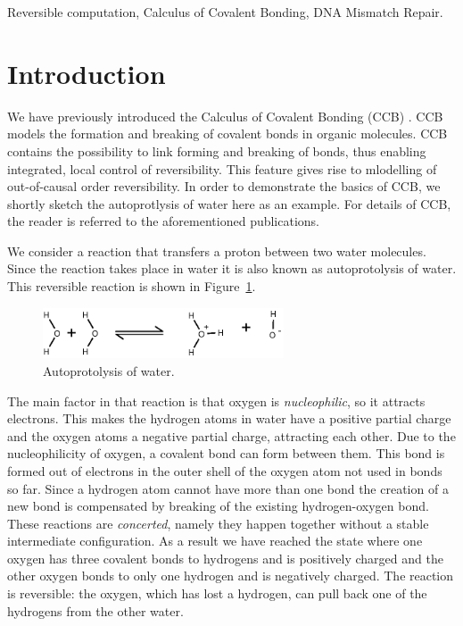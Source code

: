 \documentclass[review]{elsarticle}
\begin{document}
\begin{frontmatter}
\begin{keyword}Reversible computation, Calculus of Covalent Bonding, DNA Mismatch Repair.
\end{keyword}

\end{frontmatter}

\linenumbers

\section{Introduction}

We have previously introduced the Calculus of Covalent  Bonding (CCB) \cite{KU16,KU2017}. CCB models the formation and breaking of covalent bonds in organic molecules. CCB contains the possibility to link forming and breaking of bonds, thus enabling integrated, local control of reversibility. This feature gives rise to mlodelling of out-of-causal order reversibility. In order to demonstrate the basics of CCB, we shortly sketch the autoprotlysis of water here as an example. For details of CCB, the reader is referred to the aforementioned publications.

We consider a reaction that transfers a proton between two water molecules. Since the
reaction takes place in water it is also known as autoprotolysis of water. This reversible reaction is shown 
in Figure~\ref{fig:autoprotolysis}.

\begin{figure}
\centering
\includegraphics[height=1.5cm]{autoprotolysis}
\caption{Autoprotolysis of water.}
\label{fig:autoprotolysis}
\end{figure}

The main factor in that reaction is that oxygen is \emph{nucleophilic}, so it attracts electrons. This makes the hydrogen atoms in water
have a positive partial charge and the oxygen atoms a negative partial charge, attracting each other. Due to the nucleophilicity of 
oxygen, a covalent bond can form between them. This bond is formed out of electrons in the outer shell of the oxygen atom not used in bonds so far. Since a hydrogen atom cannot have more than one bond the creation of a new bond is compensated by breaking of the existing hydrogen-oxygen bond.
These reactions are \emph{concerted}, namely they happen together without a stable intermediate configuration. As a result we have reached the state where one oxygen has three covalent bonds to hydrogens and is positively charged
and the other oxygen bonds to only one hydrogen and is negatively charged. The reaction is reversible: the oxygen, which has lost a hydrogen, can 
pull back one of the hydrogens from the other water.
\end{document}
